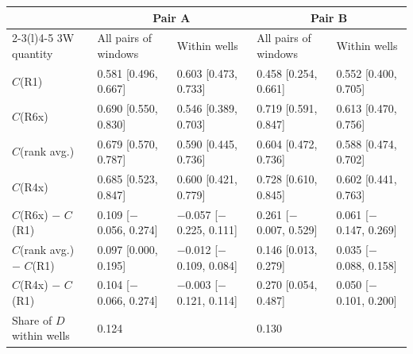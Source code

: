 \begin{tabular}{@{}l ll ll@{}}
\toprule
& \multicolumn{2}{c}{Pair A} & \multicolumn{2}{c}{Pair B} \\
\cmidrule(lr){2-3}\cmidrule(l){4-5}
3W quantity & All pairs of windows & Within wells & All pairs of windows & Within wells \\
\midrule
$C$(R1) & 0.581 [0.496, 0.667] & 0.603 [0.473, 0.733] & 0.458 [0.254, 0.661] & 0.552 [0.400, 0.705] \\
$C$(R6x) & 0.690 [0.550, 0.830] & 0.546 [0.389, 0.703] & 0.719 [0.591, 0.847] & 0.613 [0.470, 0.756] \\
$C$(rank avg.) & 0.679 [0.570, 0.787] & 0.590 [0.445, 0.736] & 0.604 [0.472, 0.736] & 0.588 [0.474, 0.702] \\
$C$(R4x) & 0.685 [0.523, 0.847] & 0.600 [0.421, 0.779] & 0.728 [0.610, 0.845] & 0.602 [0.441, 0.763] \\
$C$(R6x) $-$ $C$(R1) & 0.109 [$-$0.056, 0.274] & $-$0.057 [$-$0.225, 0.111] & 0.261 [$-$0.007, 0.529] & 0.061 [$-$0.147, 0.269] \\
$C$(rank avg.) $-$ $C$(R1) & 0.097 [0.000, 0.195] & $-$0.012 [$-$0.109, 0.084] & 0.146 [0.013, 0.279] & 0.035 [$-$0.088, 0.158] \\
$C$(R4x) $-$ $C$(R1) & 0.104 [$-$0.066, 0.274] & $-$0.003 [$-$0.121, 0.114] & 0.270 [0.054, 0.487] & 0.050 [$-$0.101, 0.200] \\
Share of $D$ within wells & \multicolumn{2}{l}{0.124} & \multicolumn{2}{l}{0.130} \\
\bottomrule
\end{tabular}
